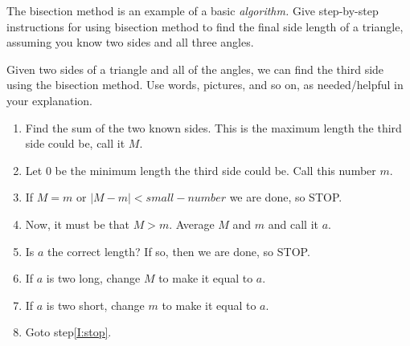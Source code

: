 \documentclass{ximera}
\begin{document}
\begin{question}
  The bisection method is an example of a basic \textit{algorithm.}
  Give step-by-step instructions for using bisection method to find
  the final side length of a triangle, assuming you know two sides and
  all three angles.
  \begin{freeResponse}
    Given two sides of a triangle and all of the angles, we can find
    the third side using the bisection method.  Use words, pictures,
    and so on, as needed/helpful in your explanation.

    \begin{enumerate}
      \item Find the sum of the two known sides. This is the maximum
        length the third side could be, call it $M$.
      \item Let $0$ be the minimum length the third side could be. Call this number $m$.
      \item\label{I:stop} If $M=m$ or $|M-m|< small-number$ we are done, so STOP.
      \item Now, it must be that $M>m$. Average $M$ and $m$ and call it $a$.
      \item Is $a$ the correct length? If so, then we are done, so STOP.
      \item If $a$ is two long, change $M$ to make it equal to $a$.
      \item If $a$ is two short, change $m$ to make it equal to $a$.
      \item Goto step\ref{I:stop}.
    \end{enumerate}
  \end{freeResponse}
\end{question}
\end{document}
